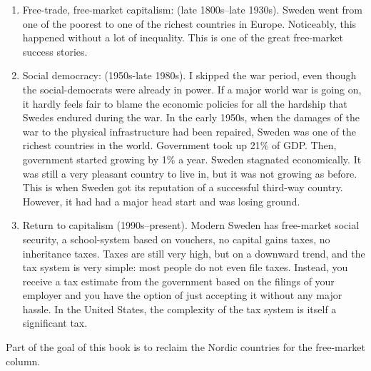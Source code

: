 \begin{enumerate}
\item Free-trade, free-market capitalism: (late 1800s--late 1930s). Sweden went
from one of the poorest to one of the richest countries in Europe. Noticeably,
this happened without a lot of inequality. This is one of the great free-market
success stories.
\item Social democracy: (1950s-late 1980s). I skipped the war period, even
though the social-democrats were already in power. If a major world war is
going on, it hardly feels fair to blame the economic policies for all the
hardship that Swedes endured during the war. In the early 1950s, when the
damages of the war to the physical infrastructure had been repaired, Sweden was
one of the richest countries in the world. Government took up 21\% of GDP.
Then, government started growing by 1\% a year. Sweden stagnated economically.
It was still a very pleasant country to live in,  but it was not growing as
before. This is when Sweden got its reputation of a successful third-way
country. However, it had had a major head start and was losing ground.
\item Return to capitalism (1990s--present). Modern Sweden has free-market
social security, a school-system based on vouchers, no capital gains taxes, no
inheritance taxes. Taxes are still very high, but on a downward trend, and the
tax system is very simple: most people do not even file taxes. Instead, you
receive a tax estimate from the government based on the filings of your
employer and you have the option of just accepting it without any major hassle.
In the United States, the complexity of the tax system is itself a significant
tax.
\end{enumerate}

Part of the goal of this book is to reclaim the Nordic countries for the
free-market column.

